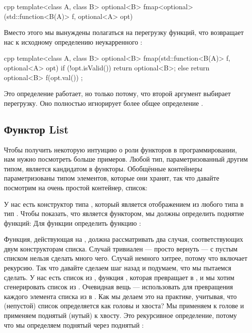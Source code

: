 \begin{snip}{cpp}
template<class A, class B>
optional<B> fmap<optional>(std::function<B(A)> f, optional<A> opt)
\end{snip}
Вместо этого мы вынуждены полагаться на перегрузку функций, что возвращает нас к исходному определению неукарренного :

\begin{snip}{cpp}
template<class A, class B>
optional<B> fmap(std::function<B(A)> f, optional<A> opt) {
    if (!opt.isValid())
        return optional<B>{};
    else
        return optional<B>{ f(opt.val()) };
}
\end{snip}
Это определение работает, но только потому, что второй аргумент  выбирает перегрузку. Оно полностью игнорирует более общее определение .

\subsection{Функтор List}

Чтобы получить некоторую интуицию о роли функторов в программировании, нам нужно посмотреть больше примеров. Любой тип, параметризованный другим типом, является кандидатом в функторы. Обобщённые контейнеры параметризованы типом элементов, которые они хранят, так что давайте посмотрим на очень простой контейнер, список:

У нас есть конструктор типа , который является отображением из любого типа  в тип . Чтобы показать, что  является функтором, мы должны определить поднятие функций: Для функции  определить функцию :

Функция, действующая на , должна рассматривать два случая, соответствующих двум конструкторам списка. Случай  тривиален — просто вернуть  — с пустым списком нельзя сделать много чего. Случай  немного хитрее, потому что включает рекурсию. Так что давайте сделаем шаг назад и подумаем, что мы пытаемся сделать. У нас есть список из , функция , которая превращает  в , и мы хотим сгенерировать список из . Очевидная вещь — использовать  для превращения каждого элемента списка из  в . Как мы делаем это на практике, учитывая, что (непустой) список определяется как  головы и хвоста? Мы применяем  к голове и применяем поднятый (нутый)  к хвосту. Это рекурсивное определение, потому что мы определяем поднятый  через поднятый :

